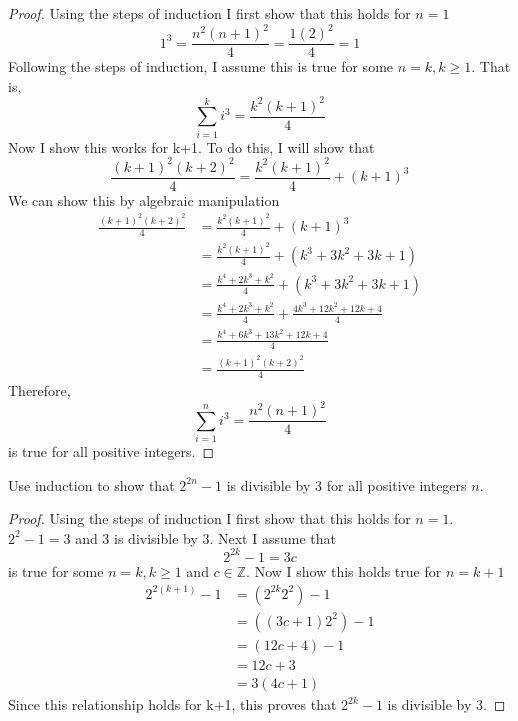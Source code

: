 \documentclass[12pt]{article}
\newenvironment{problem}[2][Problem]{\begin{trivlist}
\item[\hskip \labelsep {\bfseries #1}\hskip \labelsep {\bfseries #2.}]}{\end{trivlist}}
\begin{document}
\begin{proof}
Using the steps of induction I first show that this holds for $n=1$
$$1^3 =  \frac{n^2(n+1)^2}{4} = \frac{1(2)^2}{4} = 1$$
Following the steps of induction, I assume this is true for some $n = k, k \ge 1$. That is,
$$\sum_{i=1}^{k} i^3 = \frac{k^2(k+1)^2}{4} $$
Now I show this works for k+1. To do this, I will show that
$$\frac{(k+1)^2(k+2)^2}{4} = \frac{k^2(k+1)^2}{4} + (k+1)^3$$
We can show this by algebraic manipulation
\begin{align}
\frac{(k+1)^2(k+2)^2}{4} &=\frac{k^2(k+1)^2}{4} + (k+1)^3 \nonumber \\&= \frac{k^2(k+1)^2}{4} + (k^3 + 3k^2 + 3k + 1)\nonumber \\&= \frac{k^4 + 2k^3 + k^2}{4} + (k^3 + 3k^2 + 3k + 1) \nonumber\\&= \frac{k^4 + 2k^3 + k^2}{4} + \frac{4k^3 + 12k^2 + 12k + 4}{4}\nonumber\\ &= \frac{k^4 + 6k^3 + 13k^2 + 12k + 4}{4}\nonumber \\ &=\frac{(k+1)^2 (k+2)^2}{4} \nonumber
\end{align}
Therefore, $$\sum_{i=1}^{n}i^3 = \frac{n^2(n+1)^2}{4}$$ is true for all positive integers.
\end{proof}
\begin{problem}{3}
Use induction to show that $2^{2n} - 1$ is divisible by 3 for all positive integers $n$.
\end{problem}
\begin{proof}
Using the steps of induction I first show that this holds for $n=1$.
$2^2 -1 = 3$ and 3 is divisible by 3. Next I assume that $$2^{2k} - 1 = 3c $$ is true for some $n=k, k \ge 1$ and $c \in \mathbb{Z}$.
Now I show this holds true for $n=k+1$
\begin{align}
2^{2(k+1)} -1 &= (2^{2k} 2^2) - 1 \nonumber \\ &= ((3c+1)2^2)-1 \nonumber \\ &= (12c + 4)-1 \nonumber \\&= 12c + 3 \nonumber \\ &= 3(4c+1) \nonumber
\end{align}
Since this relationship holds for k+1, this proves that $2^{2k}-1$ is divisible by 3.
\end{proof}
\end{document}
